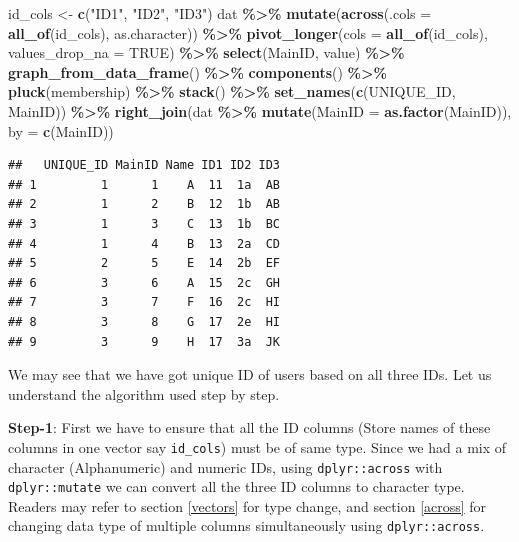 \documentclass[
]{book}
\newenvironment{Shaded}{\begin{snugshade}}{\end{snugshade}}
\newcommand{\AttributeTok}[1]{\textcolor[rgb]{0.13,0.29,0.53}{#1}}
\newcommand{\ConstantTok}[1]{\textcolor[rgb]{0.56,0.35,0.01}{#1}}
\newcommand{\FunctionTok}[1]{\textcolor[rgb]{0.13,0.29,0.53}{\textbf{#1}}}
\newcommand{\NormalTok}[1]{#1}
\newcommand{\OtherTok}[1]{\textcolor[rgb]{0.56,0.35,0.01}{#1}}
\newcommand{\SpecialCharTok}[1]{\textcolor[rgb]{0.81,0.36,0.00}{\textbf{#1}}}
\newcommand{\StringTok}[1]{\textcolor[rgb]{0.31,0.60,0.02}{#1}}
\begin{document}
\begin{Shaded}
\begin{Highlighting}[]
\NormalTok{id\_cols }\OtherTok{\textless{}{-}} \FunctionTok{c}\NormalTok{(}\StringTok{"ID1"}\NormalTok{, }\StringTok{"ID2"}\NormalTok{, }\StringTok{"ID3"}\NormalTok{)}
\NormalTok{dat }\SpecialCharTok{\%\textgreater{}\%} 
  \FunctionTok{mutate}\NormalTok{(}\FunctionTok{across}\NormalTok{(}\AttributeTok{.cols =} \FunctionTok{all\_of}\NormalTok{(id\_cols), as.character)) }\SpecialCharTok{\%\textgreater{}\%} 
  \FunctionTok{pivot\_longer}\NormalTok{(}\AttributeTok{cols =} \FunctionTok{all\_of}\NormalTok{(id\_cols), }
               \AttributeTok{values\_drop\_na =} \ConstantTok{TRUE}\NormalTok{) }\SpecialCharTok{\%\textgreater{}\%} 
  \FunctionTok{select}\NormalTok{(MainID, value) }\SpecialCharTok{\%\textgreater{}\%} 
  \FunctionTok{graph\_from\_data\_frame}\NormalTok{() }\SpecialCharTok{\%\textgreater{}\%}
  \FunctionTok{components}\NormalTok{() }\SpecialCharTok{\%\textgreater{}\%}
  \FunctionTok{pluck}\NormalTok{(membership) }\SpecialCharTok{\%\textgreater{}\%}
  \FunctionTok{stack}\NormalTok{() }\SpecialCharTok{\%\textgreater{}\%}
  \FunctionTok{set\_names}\NormalTok{(}\FunctionTok{c}\NormalTok{(}\StringTok{\textquotesingle{}UNIQUE\_ID\textquotesingle{}}\NormalTok{, }\StringTok{\textquotesingle{}MainID\textquotesingle{}}\NormalTok{)) }\SpecialCharTok{\%\textgreater{}\%}
  \FunctionTok{right\_join}\NormalTok{(dat }\SpecialCharTok{\%\textgreater{}\%} 
               \FunctionTok{mutate}\NormalTok{(}\AttributeTok{MainID =} \FunctionTok{as.factor}\NormalTok{(MainID)), }
             \AttributeTok{by =} \FunctionTok{c}\NormalTok{(}\StringTok{\textquotesingle{}MainID\textquotesingle{}}\NormalTok{))}
\end{Highlighting}
\end{Shaded}

\begin{verbatim}
##   UNIQUE_ID MainID Name ID1 ID2 ID3
## 1         1      1    A  11  1a  AB
## 2         1      2    B  12  1b  AB
## 3         1      3    C  13  1b  BC
## 4         1      4    B  13  2a  CD
## 5         2      5    E  14  2b  EF
## 6         3      6    A  15  2c  GH
## 7         3      7    F  16  2c  HI
## 8         3      8    G  17  2e  HI
## 9         3      9    H  17  3a  JK
\end{verbatim}

We may see that we have got unique ID of users based on all three IDs. Let us understand the algorithm used step by step.

\textbf{Step-1}: First we have to ensure that all the ID columns (Store names of these columns in one vector say \texttt{id\_cols}) must be of same type. Since we had a mix of character (Alphanumeric) and numeric IDs, using \texttt{dplyr::across} with \texttt{dplyr::mutate} we can convert all the three ID columns to character type. Readers may refer to section \ref{vectors} for type change, and section \ref{across} for changing data type of multiple columns simultaneously using \texttt{dplyr::across}.
\end{document}
